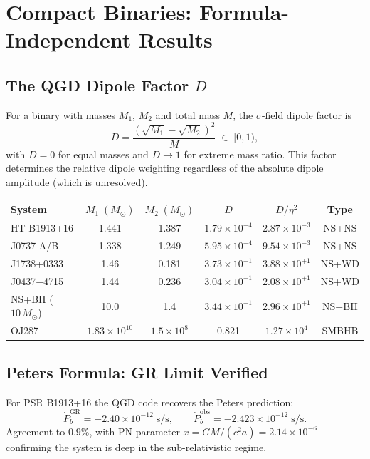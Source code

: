 \documentclass[12pt,a4paper]{article}
\newcommand{\Msun}{M_{\odot}}
\begin{document}
\section{Compact Binaries: Formula-Independent Results}

\subsection{The QGD Dipole Factor $D$}

For a binary with masses $M_1$, $M_2$ and total mass $M$, the
$\sigma$-field dipole factor is
\begin{equation}
  D = \frac{(\sqrt{M_1}-\sqrt{M_2})^2}{M}\;\in\;[0,1),
\end{equation}
with $D=0$ for equal masses and $D\to1$ for extreme mass ratio.
This factor determines the relative dipole weighting regardless of
the absolute dipole amplitude (which is unresolved).

\begin{center}
\renewcommand{\arraystretch}{1.15}
\begin{tabular}{lccccc}
\toprule
System & $M_1\;(\Msun)$ & $M_2\;(\Msun)$ & $D$ & $D/\eta^2$ & Type\\
\midrule
HT B1913+16    & 1.441 & 1.387 & $1.79\times10^{-4}$ & $2.87\times10^{-3}$ & NS+NS\\
J0737 A/B      & 1.338 & 1.249 & $5.95\times10^{-4}$ & $9.54\times10^{-3}$ & NS+NS\\
J1738+0333     & 1.46  & 0.181 & $3.73\times10^{-1}$ & $3.88\times10^{+1}$ & NS+WD\\
J0437$-$4715   & 1.44  & 0.236 & $3.04\times10^{-1}$ & $2.08\times10^{+1}$ & NS+WD\\
NS+BH ($10\,\Msun$) & 10.0 & 1.4 & $3.44\times10^{-1}$ & $2.96\times10^{+1}$ & NS+BH\\
OJ287          & $1.83\times10^{10}$ & $1.5\times10^{8}$ & 0.821 & $1.27\times10^4$ & SMBHB\\
\bottomrule
\end{tabular}
\end{center}

\subsection{Peters Formula: GR Limit Verified}

For PSR B1913+16 the QGD code recovers the Peters prediction:
\begin{equation}
  \dot{P}_b^{\mathrm{GR}} = -2.40\times10^{-12}\;\mathrm{s/s},\qquad
  \dot{P}_b^{\mathrm{obs}} = -2.423\times10^{-12}\;\mathrm{s/s}.
\end{equation}
Agreement to $0.9\%$, with PN parameter
$x=GM/(c^2 a)=2.14\times10^{-6}$ confirming the system is deep in the
sub-relativistic regime.
\end{document}
